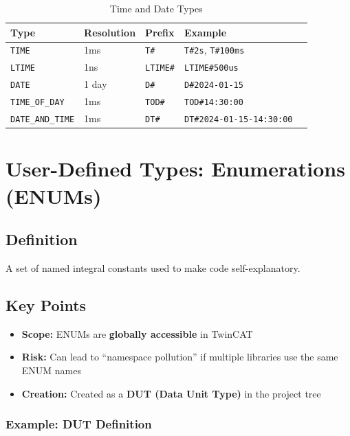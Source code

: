 \documentclass[11pt,a4paper]{article}
\begin{document}
\begin{table}[h]
\centering
\begin{tabular}{@{}lllll@{}}
\toprule
\textbf{Type} & \textbf{Resolution} & \textbf{Prefix} & \textbf{Example} \\
\midrule
\texttt{TIME} & 1ms & \texttt{T\#} & \texttt{T\#2s}, \texttt{T\#100ms} \\
\texttt{LTIME} & 1ns & \texttt{LTIME\#} & \texttt{LTIME\#500us} \\
\texttt{DATE} & 1 day & \texttt{D\#} & \texttt{D\#2024-01-15} \\
\texttt{TIME\_OF\_DAY} & 1ms & \texttt{TOD\#} & \texttt{TOD\#14:30:00} \\
\texttt{DATE\_AND\_TIME} & 1ms & \texttt{DT\#} & \texttt{DT\#2024-01-15-14:30:00} \\
\bottomrule
\end{tabular}
\caption{Time and Date Types}
\end{table}

\section{User-Defined Types: Enumerations (ENUMs)}

\subsection{Definition}

A set of named integral constants used to make code self-explanatory.

\subsection{Key Points}

\begin{itemize}
    \item \textbf{Scope:} ENUMs are \textbf{globally accessible} in TwinCAT
    \item \textbf{Risk:} Can lead to ``namespace pollution'' if multiple libraries use the same ENUM names
    \item \textbf{Creation:} Created as a \textbf{DUT (Data Unit Type)} in the project tree
\end{itemize}

\subsubsection*{Example: DUT Definition}
\end{document}
